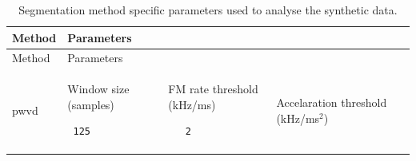 \documentclass[
]{book}
\begin{document}
\begin{longtable}[]{@{}lllll@{}}
\caption{\label{tab:segparams} Segmentation method specific parameters used to analyse the synthetic data.}\tabularnewline
\toprule
\begin{minipage}[b]{0.16\columnwidth}\raggedright
Method\strut
\end{minipage} & \begin{minipage}[b]{0.14\columnwidth}\raggedright
Parameters\strut
\end{minipage} & \begin{minipage}[b]{0.17\columnwidth}\raggedright
\strut
\end{minipage} & \begin{minipage}[b]{0.24\columnwidth}\raggedright
\strut
\end{minipage} & \begin{minipage}[b]{0.15\columnwidth}\raggedright
\strut
\end{minipage}\tabularnewline
\midrule
\endfirsthead
\toprule
\begin{minipage}[b]{0.16\columnwidth}\raggedright
Method\strut
\end{minipage} & \begin{minipage}[b]{0.14\columnwidth}\raggedright
Parameters\strut
\end{minipage} & \begin{minipage}[b]{0.17\columnwidth}\raggedright
\strut
\end{minipage} & \begin{minipage}[b]{0.24\columnwidth}\raggedright
\strut
\end{minipage} & \begin{minipage}[b]{0.15\columnwidth}\raggedright
\strut
\end{minipage}\tabularnewline
\midrule
\endhead
\begin{minipage}[t]{0.16\columnwidth}\raggedright
pwvd\strut
\end{minipage} & \begin{minipage}[t]{0.14\columnwidth}\raggedright
Window size (samples)

\begin{verbatim}
 125
\end{verbatim}
\strut
\end{minipage} & \begin{minipage}[t]{0.17\columnwidth}\raggedright
FM rate threshold (kHz/ms)

\begin{verbatim}
   2
\end{verbatim}
\strut
\end{minipage} & \begin{minipage}[t]{0.24\columnwidth}\raggedright
Accelaration threshold (kHz/ms\(^{2}\))


\end{minipage}
\end{longtable}
\end{document}
